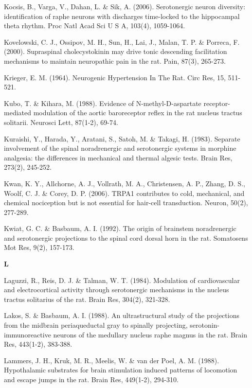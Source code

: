\documentclass[a4paper,12pt,twoside]{report}
\begin{document}
\begin{singlespacing}
\begin{footnotesize}
Kocsis, B., Varga, V., Dahan, L. \& Sik, A. (2006). Serotonergic neuron diversity: identification of raphe neurons with discharges time-locked to the hippocampal theta rhythm. Proc Natl Acad Sci U S A, 103(4), 1059-1064.

Kovelowski, C. J., Ossipov, M. H., Sun, H., Lai, J., Malan, T. P. \& Porreca, F. (2000). Supraspinal cholecystokinin may drive tonic descending facilitation mechanisms to maintain neuropathic pain in the rat. Pain, 87(3), 265-273.

Krieger, E. M. (1964). Neurogenic Hypertension In The Rat. Circ Res, 15, 511-521.

Kubo, T. \& Kihara, M. (1988). Evidence of N-methyl-D-aspartate receptor-mediated modulation of the aortic baroreceptor reflex in the rat nucleus tractus solitarii. Neurosci Lett, 87(1-2), 69-74.

Kuraishi, Y., Harada, Y., Aratani, S., Satoh, M. \& Takagi, H. (1983). Separate involvement of the spinal noradrenergic and serotonergic systems in morphine analgesia: the differences in mechanical and thermal algesic tests. Brain Res, 273(2), 245-252.

Kwan, K. Y., Allchorne, A. J., Vollrath, M. A., Christensen, A. P., Zhang, D. S., Woolf, C. J. \& Corey, D. P. (2006). TRPA1 contributes to cold, mechanical, and chemical nociception but is not essential for hair-cell transduction. Neuron, 50(2), 277-289.

Kwiat, G. C. \& Basbaum, A. I. (1992). The origin of brainstem noradrenergic and serotonergic projections to the spinal cord dorsal horn in the rat. Somatosens Mot Res, 9(2), 157-173.

\medskip
\begin{Large}\textbf{L}\end{Large}

Laguzzi, R., Reis, D. J. \& Talman, W. T. (1984). Modulation of cardiovascular and electrocortical activity through serotonergic mechanisms in the nucleus tractus solitarius of the rat. Brain Res, 304(2), 321-328.

Lakos, S. \& Basbaum, A. I. (1988). An ultrastructural study of the projections from the midbrain periaqueductal gray to spinally projecting, serotonin-immunoreactive neurons of the medullary nucleus raphe magnus in the rat. Brain Res, 443(1-2), 383-388.

Lammers, J. H., Kruk, M. R., Meelis, W. \& van der Poel, A. M. (1988). Hypothalamic substrates for brain stimulation induced patterns of locomotion and escape jumps in the rat. Brain Res, 449(1-2), 294-310.


\end{footnotesize}
\end{singlespacing}
\end{document}
